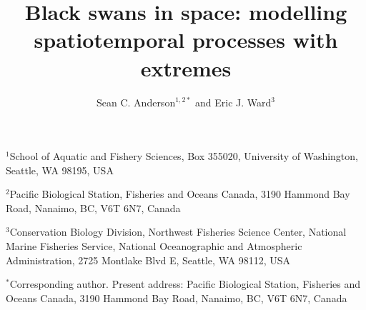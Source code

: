\documentclass[12pt,english]{article}
\title{
  \vspace{-1.4cm}
  Black swans in space:
  modelling
  spatiotemporal processes with extremes}
\author{
Sean C. Anderson$^{1,2\ast}$ and
Eric J. Ward$^3$
}
\date{}
\begin{document}
\maketitle

$^1$School of Aquatic and Fishery Sciences, Box 355020, University of
Washington, Seattle, WA 98195, USA

$^2$Pacific Biological Station,
Fisheries and Oceans Canada,
3190 Hammond Bay Road,
Nanaimo, BC, V6T 6N7, Canada

$^3$Conservation Biology Division, Northwest Fisheries Science Center, National
Marine Fisheries Service, National Oceanographic and Atmospheric Administration,
2725 Montlake Blvd E, Seattle, WA 98112, USA

$^{\ast}$Corresponding author. Present address:
Pacific Biological Station,
Fisheries and Oceans Canada,
3190 Hammond Bay Road,
Nanaimo, BC, V6T 6N7, Canada

\RaggedRight
{}
\end{document}
